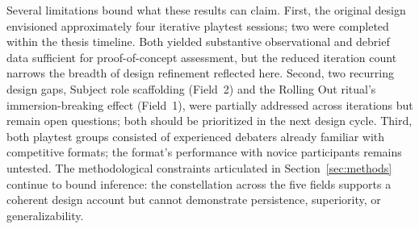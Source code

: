 Several limitations bound what these results can claim. First, the original design envisioned approximately four iterative playtest sessions; two were completed within the thesis timeline. Both yielded substantive observational and debrief data sufficient for proof-of-concept assessment, but the reduced iteration count narrows the breadth of design refinement reflected here. Second, two recurring design gaps, Subject role scaffolding (Field~2) and the Rolling Out ritual's immersion-breaking effect (Field~1), were partially addressed across iterations but remain open questions; both should be prioritized in the next design cycle. Third, both playtest groups consisted of experienced debaters already familiar with competitive formats; the format's performance with novice participants remains untested. The methodological constraints articulated in Section~\ref{sec:methods} continue to bound inference: the constellation across the five fields supports a coherent design account but cannot demonstrate persistence, superiority, or generalizability.
